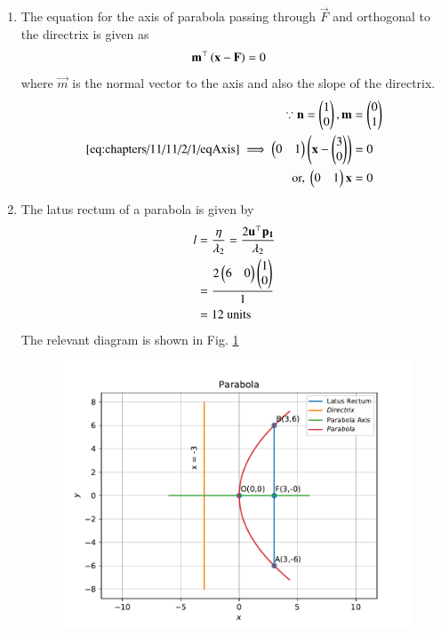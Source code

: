 \begin{enumerate}
\item The equation for the axis of parabola passing through $\vec{F}$ and orthogonal to the directrix is given as  
\begin{align}
	\label{eq:chapters/11/11/2/1/eqAxis}
	\mathbf{m}^\top\left(\mathbf{x}-\mathbf{F}\right) &= 0
\end{align}
where $\vec{m}$ is the normal vector to the axis and also the slope of the directrix.
\begin{align}
	\because \mathbf{n} = \begin{pmatrix}1 \\ 0 \end{pmatrix}, \mathbf{m} &= \begin{pmatrix}0 \\ 1\end{pmatrix} \\
	\eqref{eq:chapters/11/11/2/1/eqAxis} \implies \begin{pmatrix}0 & 1\end{pmatrix}\begin{pmatrix}\mathbf{x} - \begin{pmatrix}3 \\ 0\end{pmatrix}\end{pmatrix} &= 0\\
	\text{or, }	\begin{pmatrix}0 & 1\end{pmatrix}\mathbf{x} &= 0 
\end{align}
\item The latus rectum of a parabola is given by 
\begin{align}
	l &= \frac{\eta}{\lambda_2}  
	 = \frac{2\mathbf{u}^\top\mathbf{p_1}}{\lambda_2} \\
	 &= \frac{2\begin{pmatrix}6 & 0\end{pmatrix}\begin{pmatrix}1 \\ 0\end{pmatrix}}{1} \\
	 &= 12 \text{ units }
\end{align}
The relevant diagram is shown in Fig. \ref{fig:11/11/2/1Fig1}
\begin{figure}[!h]
	\begin{center}
		\includegraphics[width=\columnwidth]{chapters/11/11/2/1/figs/problem1.pdf}
	\end{center}
\caption{}
\label{fig:11/11/2/1Fig1}
\end{figure}
\end{enumerate}
